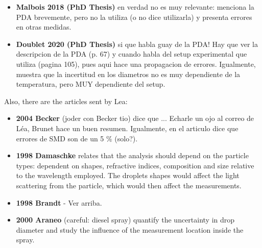 \begin{itemize}
	\item \textbf{Malbois 2018 (PhD Thesis)} en verdad no es muy relevante: menciona la PDA brevemente, pero no la utiliza (o no dice utilizarla) y presenta errores en otras medidas.
	
	\item \textbf{Doublet 2020 (PhD Thesis)} si que habla guay de la PDA! Hay que ver la descripcion de la PDA (p. 67) y cuando habla del setup experimental que utiliza (pagina 105), pues aqui hace una propagacion de errores. Igualmente, muestra que la incertitud en los diametros no es muy dependiente de la temperatura, pero MUY dependiente del setup.

\end{itemize}

Also, there are the articles sent by Lea:

\begin{itemize}

	\item \textbf{2004 Becker} (joder con Becker tio) dice que ... Echarle un ojo al correo de Léa, Brunet hace un buen resumen. Igualmente, en el articulo dice que errores de SMD son de un 5 $\%$ (solo?).
	
	\item \textbf{1998 Damaschke} relates that the analysis should depend on the particle types: dependent on shapes, refractive indices, composition and size relative to the wavelength employed. The droplets shapes would affect the light scattering from the particle, which would then affect the measurements.
	
	\item \textbf{1998 Brandt} - Ver arriba.
	
	\item \textbf{2000 Araneo} (careful: diesel spray) quantify the uncertainty in drop diameter and study the influence of the measurement location inside the spray.

\end{itemize}
